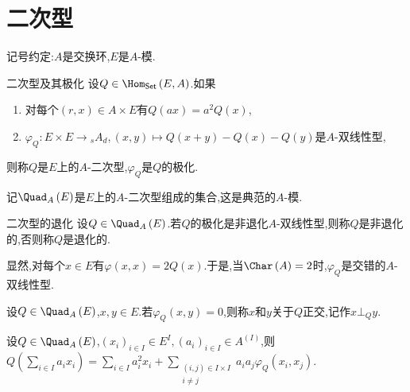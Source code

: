 \section{二次型}

记号约定:$A$是交换环,$E$是$A$-模.

\begin{definition}{二次型及其极化}{}
	设$Q\in\Hom_{\mathsf{Set}}\left(E,A\right)$.如果
	\begin{enumerate}
		\item 对每个$\left(r,x\right)\in A\times E$有$Q\left(ax\right)=a^{2}Q\left(x\right)$,
		\item $\varphi_{Q}:E\times E\to {}_{s}A_{d},\left(x,y\right)\mapsto Q\left(x+y\right)-Q\left(x\right)-Q\left(y\right)$是$A$-双线性型,
	\end{enumerate}
	则称$Q$是$E$上的$A$-二次型,$\varphi_{Q}$是$Q$的极化.
\end{definition}

\begin{definition}{}{}
	记$\Quad_{A}\left(E\right)$是$E$上的$A$-二次型组成的集合,这是典范的$A$-模.
\end{definition}

\begin{definition}{二次型的退化}{}
	设$Q\in\Quad_{A}\left(E\right)$.若$Q$的极化是非退化$A$-双线性型,则称$Q$是非退化的,否则称$Q$是退化的.
\end{definition}

\begin{remark}{}{}
	显然,对每个$x\in E$有$\varphi\left(x,x\right)=2Q\left(x\right)$.于是,当$\Char\left(A\right)=2$时,$\varphi_{Q}$是交错的$A$-双线性型.
\end{remark}

\begin{definition}{}{}
	设$Q\in\Quad_{A}\left(E\right)$,$x,y\in E$.若$\varphi_{Q}\left(x,y\right)=0$,则称$x$和$y$关于$Q$正交,记作$x\bot_{Q} y$.
\end{definition}

\begin{proposition}{}{}
	设$Q\in\Quad_{A}\left(E\right)$,$\left(x_{i}\right)_{i\in I}\in E^{I},\left(a_{i}\right)_{i\in I}\in A^{\left(I\right)}$,则$Q\left(\sum\limits_{i\in I}a_{i}x_{i}\right)=\sum\limits_{i\in I}a_{i}^{2}x_{i}+\sum\limits_{\substack{\left(i,j\right)\in I\times I\\ i\neq j}}a_{i}a_{j}\varphi_{Q}\left(x_{i},x_{j}\right)$.
\end{proposition}


